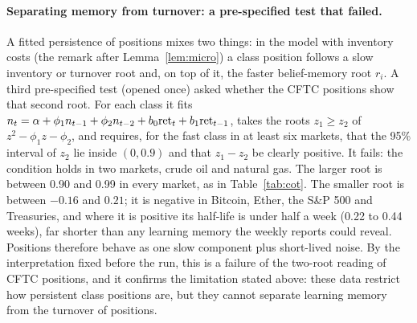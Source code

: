 \documentclass[12pt]{article}
\theoremstyle{definition}
\theoremstyle{remark}
\begin{document}
\paragraph{Separating memory from turnover: a pre-specified test that failed.} A fitted persistence of positions mixes two things: in the model with inventory costs (the remark after Lemma~\ref{lem:micro}) a class position follows a slow inventory or turnover root and, on top of it, the faster belief-memory root $r_i$. A third pre-specified test (opened once) asked whether the CFTC positions show that second root. For each class it fits $n_t=\alpha+\phi_1n_{t-1}+\phi_2n_{t-2}+b_0{\rm ret}_t+b_1{\rm ret}_{t-1}$, takes the roots $z_1\ge z_2$ of $z^2-\phi_1z-\phi_2$, and requires, for the fast class in at least six markets, that the 95\% interval of $z_2$ lie inside $(0,0.9)$ and that $z_1-z_2$ be clearly positive. It fails: the condition holds in two markets, crude oil and natural gas. The larger root is between 0.90 and 0.99 in every market, as in Table~\ref{tab:cot}. The smaller root is between $-0.16$ and $0.21$; it is negative in Bitcoin, Ether, the S\&P 500 and Treasuries, and where it is positive its half-life is under half a week (0.22 to 0.44 weeks), far shorter than any learning memory the weekly reports could reveal. Positions therefore behave as one slow component plus short-lived noise. By the interpretation fixed before the run, this is a failure of the two-root reading of CFTC positions, and it confirms the limitation stated above: these data restrict how persistent class positions are, but they cannot separate learning memory from the turnover of positions.
\end{document}
